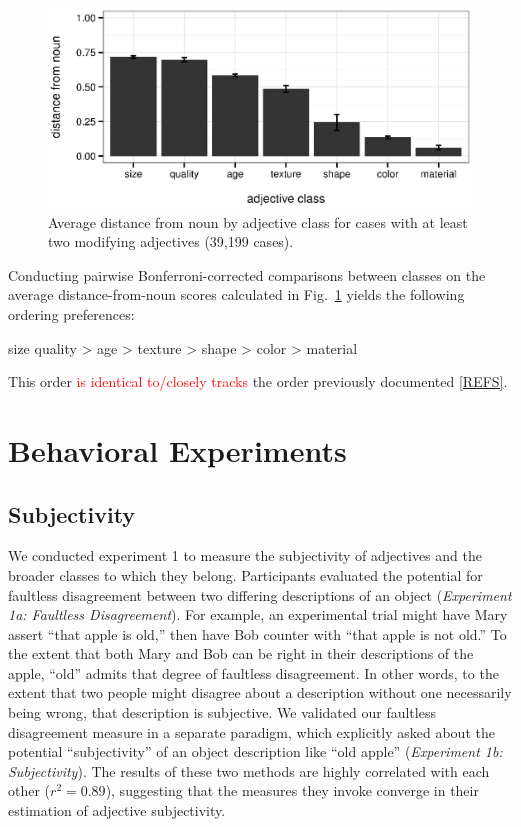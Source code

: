 \documentclass{pnastwo}
\newcommand{\figref}[1]{Fig.~\ref{#1}}
\newcommand{\red}[1]{\textcolor{Red}{#1}}
\begin{document}
\begin{article}
\begin{figure}[h]
	\centering
	\includegraphics[width=.95\linewidth]{plots/corpus_distance_plot.eps}
	\caption{Average distance from noun by adjective class for cases with at least two modifying adjectives (39,199 cases).}\label{distance-from-noun}
	\label{fig:distance}
\end{figure}

Conducting pairwise Bonferroni-corrected comparisons between classes on the average distance-from-noun scores calculated in \figref{fig:distance} yields the following ordering preferences:

\be size \geq quality > age > texture > shape > color > material \label{inferred-order-preferences}\ee

This order \red{is identical to/closely tracks} the order previously documented \ref{REFS}.

\section{Behavioral Experiments}
	
\subsection{Subjectivity} We conducted experiment 1 to measure the subjectivity of adjectives and the broader classes to which they belong. Participants evaluated the potential for faultless disagreement between two differing descriptions of an object (\emph{Experiment 1a: Faultless Disagreement}). For example, an experimental trial might have Mary assert ``that apple is old,'' then have Bob counter with ``that apple is not old.'' To the extent that both Mary and Bob can be right in their descriptions of the apple, ``old'' admits that degree of faultless disagreement. In other words, to the extent that two people might disagree about a description without one necessarily being wrong, that description is subjective. We validated our faultless disagreement measure in a separate paradigm, which explicitly asked about the potential ``subjectivity'' of an object description like ``old apple'' (\emph{Experiment 1b: Subjectivity}). The results of these two methods are highly correlated with each other ($r^{2} = 0.89$), suggesting that the measures they invoke converge in their estimation of adjective subjectivity.


\end{article}
\end{document}
